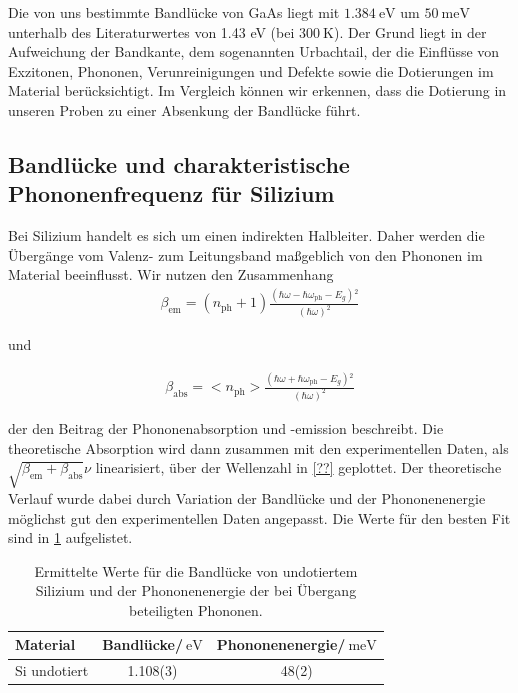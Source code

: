 \documentclass[paper=a4,fontsize=10pt,DIV=18,twocolumn,parskip=half]{scrartcl}
\numberwithin{equation}{section}    %
\begin{document}
Die von uns bestimmte Bandlücke von GaAs liegt mit $\SI{1.384}{\eV}$ um 
$\SI{50}{\milli\eV}$ unterhalb des Literaturwertes von 1.43 eV (bei 
$\SI{300}{\K}$). Der Grund liegt in der Aufweichung der Bandkante, dem 
sogenannten Urbachtail, der die Einflüsse von
Exzitonen, Phononen, Verunreinigungen und Defekte sowie die Dotierungen im 
Material berücksichtigt. Im Vergleich können wir erkennen, dass die Dotierung in 
unseren Proben zu einer Absenkung der Bandlücke führt.

\subsection{Bandlücke und charakteristische Phononenfrequenz für Silizium}

Bei Silizium handelt es sich um einen indirekten Halbleiter. Daher werden die 
Übergänge vom Valenz- zum Leitungsband maßgeblich von den Phononen im Material 
beeinflusst. Wir nutzen den Zusammenhang
\begin{align}
    \beta _{\text{em} }=\left(n_{\text{ph}}+1\right)\frac{\left(\hbar \omega 
    -\hbar \omega _{\text{ph}}-E_g\right){}^2}{(\hbar \omega )^2}
\end{align}

und 

\begin{align}
    \beta _{\text{abs} }=<n_{\text{ph}}>\frac{\left(\hbar \omega +\hbar \omega 
    _{\text{ph}}-E_g\right){}^2}{(\hbar \omega )^2}
\end{align}

der den Beitrag der Phononenabsorption und \mbox{-emission} beschreibt. Die 
theoretische Absorption wird dann zusammen mit den experimentellen Daten, als 
$\sqrt{\beta _{\text{em} }+\beta _{\text{abs} }}\nu $ linearisiert, über der 
Wellenzahl in \cref{??} geplottet. Der theoretische Verlauf wurde dabei durch 
Variation der Bandlücke und der Phononenenergie möglichst gut den 
experimentellen Daten angepasst. Die Werte für den besten Fit sind in \cref{phe} 
aufgelistet.
\begin{table}
    \begin{center}
\begin{tabular}{ l | c c }
  Material & Bandlücke/$\SI{}{\eV}$ & Phononenenergie/$\SI{}{\milli\eV}$\\
  \hline
  Si undotiert & 1.108(3) & 48(2)
\end{tabular}
  \caption{Ermittelte Werte für die Bandlücke von undotiertem Silizium und der 
  Phononenenergie der bei Übergang beteiligten Phononen.}
  \label{phe}
    \end{center}
\end{table}
\end{document}
